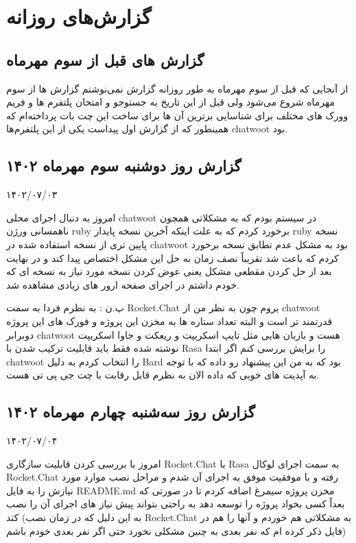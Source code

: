 \section{گزارش‌های روزانه}


\subsection{گزارش های قبل از سوم مهرماه}

از آنجایی که قبل از سوم مهرماه به طور روزانه گزارش نمی‌نوشتم گزارش ها از سوم مهرماه شروع می‌شود ولی قبل از این تاریخ به جستوجو و امتحان پلتفرم ها و فریم وورک های مختلف برای شناسایی برترین آن ها برای ساخت این چت بات پرداخته‌ام که همینطور که از گزارش اول پیداست یکی از این پلتفرم‌ها chatwoot بود.


\subsection{گزارش روز دوشنبه سوم مهرماه ۱۴۰۲}

۱۴۰۲/۰۷/۰۳

امروز به دنبال اجرای محلی chatwoot در سیستم بودم که به مشکلاتی همچون ناهمسانی ورژن ruby برخورد کردم که به علت اینکه آخرین نسخه پایدار ruby نسخه پایین تری از نسخه استفاده شده در chatwoot بود به مشکل عدم تطابق نسخه برخورد کردم که باعث شد تقریباً نصف زمان به حل این مشکل اختصاص پیدا کند و در نهایت بعد از حل کردن مقطعی مشکل یعنی عوض کردن نسخه مورد نیاز به نسخه ای که خودم داشتم در اجرای صفحه ارور های زیادی مشاهده شد.

پ.ن : به نظرم فردا به سمت Rocket.Chat بروم چون به نظر من از chatwoot قدرتمند تر است و البته تعداد ستاره ها به مخزن این پروژه و فورک های این پروژه دوبرابر chatwoot هست و بازبان هایی مثل تایپ اسکریپت و ریعکت و جاوا اسکریپت نوشته شده فقط باید قابلیت ترکیب شدن با Rasa را برایش بررسی کنم اگر ابتدا chatwoot را انتخاب کردم به دلیل Bard بود که به من این پیشنهاد رو داده که با توجه به آپدیت های خوبی که داده الان به نظرم قابل رقابت با چت جی پی تی هست.


\subsection{گزارش روز سه‌شنبه چهارم مهرماه ۱۴۰۲}

۱۴۰۲/۰۷/۰۴

امروز با بررسی کردن قابلیت سازگاری Rocket.Chat با Rasa به سمت اجرای لوکال Rocket.Chat رفته و با موفقیت موفق به اجرای آن شدم و مراحل نصب موارد مورد نیازش را به فایل README.md مخزن پروژه سیمرغ اضافه کردم تا در صورتی که بعداً کسی بخواد پروژه را توسعه دهد به راحتی بتواند پیش نیاز های اجرای آن را نصب کند (به این دلیل که در زمان نصب Rocket.Chat به مشکلاتی هم خوردم و آنها را هم در فایل ذکر کرده ام که نفر بعدی به چنین مشکلی نخورد حتی اگر نفر بعدی خودم باشم)

